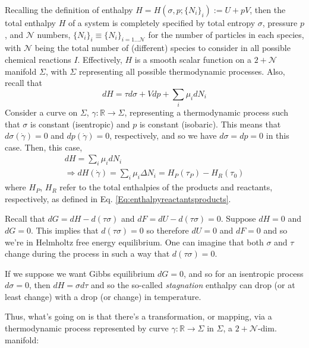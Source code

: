 \documentclass[10pt]{amsart}
\begin{document}
\begin{multicols*}{2}
Recalling the definition of enthalpy $H = H(\sigma,p;\lbrace N_i \rbrace_i):= U + pV$, then the total enthalpy $H$ of a system is completely specified by total entropy $\sigma$, pressure $p$, and $\mathcal{N}$ numbers, $\lbrace N_i \rbrace_i \equiv \lbrace N_i \rbrace_{i=1 \dots \mathcal{N}}$ for the number of particles in each species, with $\mathcal{N}$ being the total number of (different) species to consider in all possible chemical reactions $I$.  Effectively, $H$ is a smooth scalar function on a $2+\mathcal{N}$ manifold $\Sigma$, with $\Sigma$ representing all possible thermodynamic processes.   Also, recall that  
\[
dH = \tau d\sigma + Vdp + \sum_i \mu_i dN_i
\]
Consider a curve on $\Sigma$, $\gamma:\mathbb{R} \to \Sigma$, representing a thermodynamic process such that $\sigma$ is constant (isentropic) and $p$ is constant (isobaric).  This means that $d\sigma(\dot{\gamma})=0$ and $dp(\dot{\gamma})=0$, respectively, and so we have $d\sigma =dp=0$ in this case.  Then, this case,
\[
\begin{gathered}
  dH = \sum_i \mu_i dN_i \\
  \Longrightarrow dH(\dot{\gamma}) = \sum_i \mu_i \Delta N_i = H_P(\tau_P) - H_R(\tau_0)
\end{gathered}
\]
where $H_P$, $H_R$ refer to the total enthalpies of the products and reactants, respectively, as defined in Eq. \ref{Eq:enthalpyreactantsproducts}.  




Recall that $dG = dH-d(\tau \sigma)$ and $dF = dU-d(\tau \sigma)=0$.  Suppose $dH=0$ and $dG=0$.  This implies that $d(\tau \sigma)=0$ so therefore $dU=0$ and $dF=0$ and so we're in Helmholtz free energy equilibrium.  One can imagine that both $\sigma$ and $\tau$ change during the process in such a way that $d(\tau \sigma)=0$.  

If we suppose we want Gibbs equilibrium $dG=0$, and so for an isentropic process $d\sigma =0$, then $dH = \sigma d\tau$ and so the so-called \emph{stagnation} enthalpy can drop (or at least change) with a drop (or change) in temperature.  

Thus, what's going on is that there's a transformation, or mapping, via a thermodynamic process represented by curve $\gamma : \mathbb{R} \to \Sigma$ in $\Sigma$, a $2+\mathcal{N}$-dim. manifold:


\end{multicols*}
\end{document}
